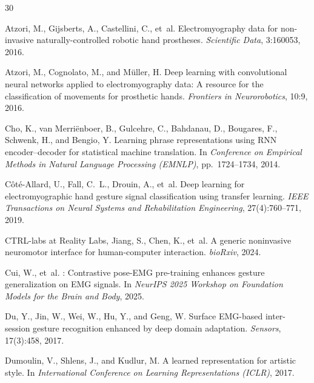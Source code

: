 \documentclass[10pt]{article}
\begin{document}

\begin{thebibliography}{30}

Atzori, M., Gijsberts, A., Castellini, C., et~al.
\newblock Electromyography data for non-invasive naturally-controlled robotic hand prostheses.
\newblock \emph{Scientific Data}, 3:160053, 2016.

Atzori, M., Cognolato, M., and M{\"u}ller, H.
\newblock Deep learning with convolutional neural networks applied to electromyography data: A resource for the classification of movements for prosthetic hands.
\newblock \emph{Frontiers in Neurorobotics}, 10:9, 2016.

Cho, K., van Merri{\"e}nboer, B., Gulcehre, C., Bahdanau, D., Bougares, F., Schwenk, H., and Bengio, Y.
\newblock Learning phrase representations using {RNN} encoder--decoder for statistical machine translation.
\newblock In \emph{Conference on Empirical Methods in Natural Language Processing (EMNLP)}, pp.\ 1724--1734, 2014.

C{\^o}t{\'e}-Allard, U., Fall, C.~L., Drouin, A., et~al.
\newblock Deep learning for electromyographic hand gesture signal classification using transfer learning.
\newblock \emph{IEEE Transactions on Neural Systems and Rehabilitation Engineering}, 27(4):760--771, 2019.

CTRL-labs at Reality Labs, Jiang, S., Chen, K., et~al.
\newblock A generic noninvasive neuromotor interface for human-computer interaction.
\newblock \emph{bioRxiv}, 2024.

Cui, W., et~al.
: Contrastive pose-{EMG} pre-training enhances gesture generalization on {EMG} signals.
\newblock In \emph{NeurIPS 2025 Workshop on Foundation Models for the Brain and Body}, 2025.

Du, Y., Jin, W., Wei, W., Hu, Y., and Geng, W.
\newblock Surface {EMG}-based inter-session gesture recognition enhanced by deep domain adaptation.
\newblock \emph{Sensors}, 17(3):458, 2017.

Dumoulin, V., Shlens, J., and Kudlur, M.
\newblock A learned representation for artistic style.
\newblock In \emph{International Conference on Learning Representations (ICLR)}, 2017.


\end{thebibliography}
\end{document}
